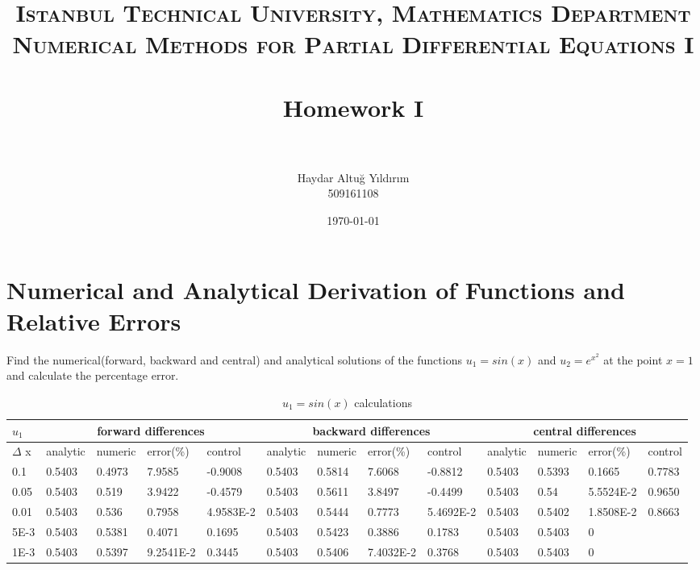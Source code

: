 \documentclass[paper=a4, fontsize=11pt]{scrartcl} %
\title{	
\normalfont \normalsize 
\textsc{Istanbul Technical University, Mathematics Department \\ Numerical Methods for Partial Differential Equations I} \\ [25pt]
\horrule{0.5pt} \\[0.4cm] %
\large Homework I \\ %
\horrule{0.5pt} \\[0.4cm] %
}
\author{Haydar Altu\u{g} Y{\i}ld{\i}r{\i}m \\ 509161108}
\date{\normalsize\today} %
\numberwithin{equation}{section} %
\numberwithin{figure}{section} %
\numberwithin{table}{section} %
\begin{document}
\maketitle %


\section{Numerical and Analytical Derivation of Functions and Relative Errors}

Find the numerical(forward, backward and central) and analytical solutions of the functions $u_1=sin(x)$ and $u_2 = e ^{ {x^ 2}} $ at the point $x=1$ and calculate the percentage error.

\begin{table}[ht]
\centering
\begin{adjustbox}{width=1\textwidth}
\small
\begin{tabular}{ | l | l | l | l | l | l | l | l | l | l | l | l | l | }
\hline
	$u_1$ & \multicolumn{4}{c|}{forward differences}  & \multicolumn{4}{c|}{backward differences} &  \multicolumn{4}{c|}{central differences}   \\ \hline
	$\Delta$ x & analytic & numeric & error(\%) & control & analytic & numeric & error(\%) & control & analytic & numeric & error(\%) & control \\ \hline
	0.1 & 0.5403 & 0.4973 & 7.9585 & -0.9008 & 0.5403 & 0.5814 & 7.6068 & -0.8812 & 0.5403 & 0.5393 & 0.1665 & 0.7783 \\ \hline
	0.05 & 0.5403 & 0.519 & 3.9422 & -0.4579 & 0.5403 & 0.5611 & 3.8497 & -0.4499 & 0.5403 & 0.54 & 5.5524E-2 & 0.9650 \\ \hline
	0.01 & 0.5403 & 0.536 & 0.7958 & 4.9583E-2 & 0.5403 & 0.5444 & 0.7773 & 5.4692E-2 & 0.5403 & 0.5402 & 1.8508E-2 & 0.8663 \\ \hline
	5E-3 & 0.5403 & 0.5381 & 0.4071 & 0.1695 & 0.5403 & 0.5423 & 0.3886 & 0.1783 & 0.5403 & 0.5403 & 0 &  \\ \hline
	1E-3 & 0.5403 & 0.5397 & 9.2541E-2 & 0.3445 & 0.5403 & 0.5406 & 7.4032E-2 & 0.3768 & 0.5403 & 0.5403 & 0 &  \\ \hline
\end{tabular}
\end{adjustbox}
\caption{$u_1 = sin(x)$ calculations}
\end{table} 
\end{document}
